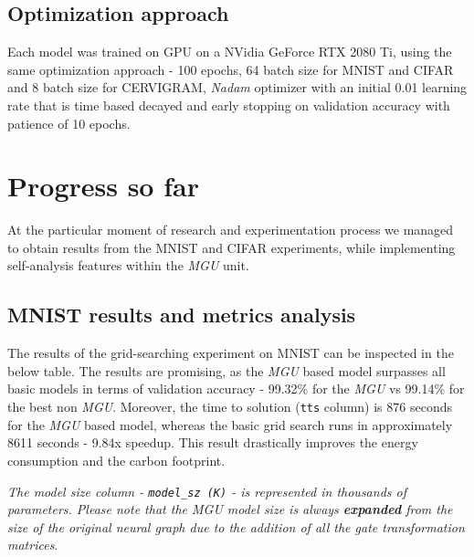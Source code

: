 \documentclass[11pt]{article}
\begin{document}
    \hypertarget{optimization-approach}{%
\subsection{Optimization approach}\label{optimization-approach}}

Each model was trained on GPU on a NVidia GeForce RTX 2080 Ti, using the
same optimization approach - 100 epochs, 64 batch size for MNIST and
CIFAR and 8 batch size for CERVIGRAM, \emph{Nadam} optimizer with an
initial 0.01 learning rate that is time based decayed and early stopping
on validation accuracy with patience of 10 epochs.

    \hypertarget{progress-so-far}{%
\section{Progress so far}\label{progress-so-far}}

At the particular moment of research and experimentation process we
managed to obtain results from the MNIST and CIFAR experiments, while
implementing self-analysis features within the \emph{MGU} unit.

\hypertarget{mnist-results-and-metrics-analysis}{%
\subsection{MNIST results and metrics
analysis}\label{mnist-results-and-metrics-analysis}}

The results of the grid-searching experiment on MNIST can be inspected
in the below table. The results are promising, as the \emph{MGU} based
model surpasses all basic models in terms of validation accuracy -
99.32\% for the \emph{MGU} vs 99.14\% for the best non \emph{MGU}.
Moreover, the time to solution (\texttt{tts} column) is 876 seconds for
the \emph{MGU} based model, whereas the basic grid search runs in
approximately 8611 seconds - 9.84x speedup. This result drastically
improves the energy consumption and the carbon footprint.

\emph{The model size column - \texttt{model\_sz\ (K)} - is represented
in thousands of parameters. Please note that the MGU model size is
always \textbf{expanded} from the size of the original neural graph due
to the addition of all the gate transformation matrices}.
\end{document}
